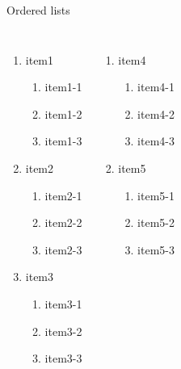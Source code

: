 \begin{frame}{Ordered lists}
\begin{columns}
\begin{enumerate}
    \item item1
    \begin{enumerate}
        \item item1-1
        \item item1-2
        \item item1-3
    \end{enumerate}
    \item item2
    \begin{enumerate}
        \item item2-1
        \item item2-2
        \item item2-3
    \end{enumerate}
    \item item3
    \begin{enumerate}
        \item item3-1
        \item item3-2
        \item item3-3
    \end{enumerate}
\end{enumerate}

\begin{enumerate} \itemsep2em
    \setcounter{enumi}{3}
    \item item4
    \begin{enumerate} \itemsep1em
        \item item4-1
        \item item4-2
        \item item4-3
    \end{enumerate}
    \item item5
    \begin{enumerate} \itemsep1em
        \item item5-1
        \item item5-2
        \item item5-3
    \end{enumerate}
\end{enumerate}
\end{columns}
\end{frame}
